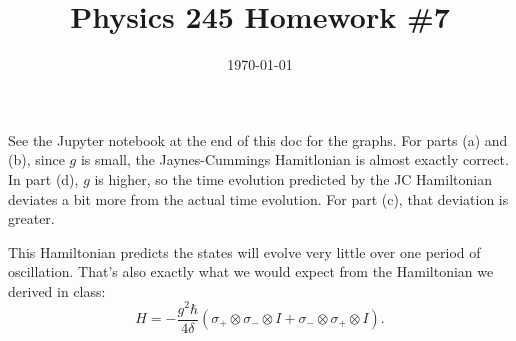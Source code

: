 \documentclass{article}
\date{\today}
\title{Physics 245 Homework \#7}
\begin{document}
\maketitle

\begin{prob}
\end{prob}
See the Jupyter notebook at the end of this doc for the graphs. For parts (a) and (b), since $g$ is small, the Jaynes-Cummings Hamitlonian is almost exactly correct. In part (d), $g$ is higher, so the time evolution predicted by the JC Hamiltonian deviates a bit more from the actual time evolution. For part (c), that deviation is greater.

\bigskip
\begin{prob}
\end{prob}
This Hamiltonian predicts the states will evolve very little over one period of oscillation. That's also exactly what we would expect from the Hamiltonian we derived in class:
\[ H = -\frac{g^2\hbar}{4 \delta} \left( \sigma_+ \otimes \sigma_- \otimes I + \sigma_- \otimes \sigma_+ \otimes I \right). \]
\end{document}
